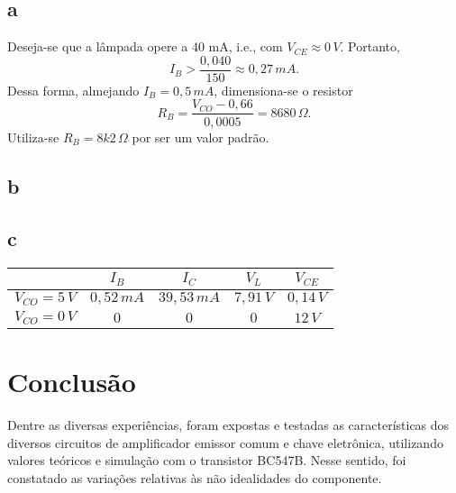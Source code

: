 \documentclass[a4paper]{report}
\begin{document}
\subsection*{a}

Deseja-se que a lâmpada opere a 40 mA, i.e., com $V_{CE}\approx 0\,V$. Portanto, \[
I_B > \frac{0,040}{150} \approx 0,27\,mA
.\] Dessa forma, almejando $I_B = 0,5\,mA$, dimensiona-se o resistor \[
R_B = \frac{V_{CO}-0,66}{0,0005} = 8680\,\Omega
.\] Utiliza-se $R_B = 8k2\,\Omega$ por ser um valor padrão.

\subsection*{b}

\subsection*{c}

\begin{table}[H]
    \centering
    \begin{tabular}{c | c | c | c | c}
     & $I_B$ & $I_C$ & $V_L$ & $V_{CE}$ \\
     \hline
	$V_{CO} = 5\,V$ & $0,52\,mA$ & $39,53\,mA$ & $7,91\,V$ & $0,14\,V$ \\
	$V_{CO} = 0\,V$ & $0$ & $0$ & $0$ & $12\,V$
    \end{tabular}
\end{table}

\section{Conclusão}

Dentre as diversas experiências, foram expostas e testadas as características dos diversos circuitos de amplificador emissor comum e chave eletrônica, utilizando valores teóricos e simulação com o transistor BC547B. Nesse sentido, foi constatado as variações relativas às não idealidades do componente.
\end{document}
